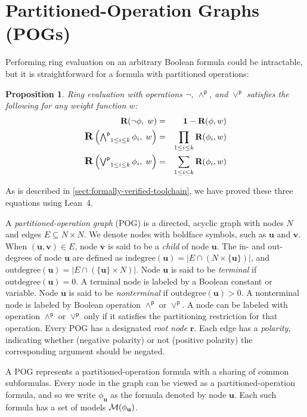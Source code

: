 \documentclass[twoside,11pt]{article}
\newcommand{\pand}{\mathbin{\land^\textsf{p}}}
\newcommand{\por}{\mathbin{\lor^\textsf{p}}}
\DeclareMathOperator*{\Pand}{\bigwedge^\textsf{p}}
\DeclareMathOperator*{\Por}{\bigvee^\textsf{p}}
\newcommand{\boolnot}{\neg}
\newcommand{\rep}{\textbf{R}}
\newcommand{\mulident}{\textbf{1}}
\newcommand{\modelset}{{\cal M}}
\newcommand{\indegree}{\textrm{indegree}}
\newcommand{\outdegree}{\textrm{outdegree}}
\newcommand{\makenode}[1]{\mathbf{#1}}
\newcommand{\nodeu}{\makenode{u}}
\newcommand{\nodev}{\makenode{v}}
\newcommand{\noder}{\makenode{r}}
\newtheorem{prop}{Proposition}
\newcommand{\lean}{Lean~4}
\begin{document}
\section{Partitioned-Operation Graphs (POGs)}
\label{sect:pog}

Performing ring evaluation on an arbitrary Boolean formula could be intractable, but it is straightforward for a formula with partitioned operations:
\begin{prop}
\label{prop:ring:eval}
Ring evaluation with operations $\boolnot$, $\pand$, and $\por$ satisfies the following for any weight function $w$:
\begin{eqnarray}
\rep(\boolnot \phi,\; w) &=& \mulident - \rep(\phi, w) \label{eqn:ring:negation}\\
\textstyle
\scalebox{1.2}{\rep}\left(\Pand_{1 \leq i \leq k} \phi_i,\; w \right) &=& \prod_{1 \leq i \leq k} \rep(\phi_i, w) \label{eqn:ring:product}\\
\textstyle
\scalebox{1.2}{\rep}\left(\Por_{1 \leq i \leq k} \phi_i,\; w\right) &=& \sum_{1 \leq i \leq k} \rep(\phi_i, w) \label{eqn:ring:sum} 
\end{eqnarray}
\end{prop}
As is described in \ref{sect:formally-verified-toolchain}, we have proved these three equations using \lean{}.

A \emph{partitioned-operation graph} (POG) is a directed, acyclic
graph with nodes $N$ and edges $E \subseteq N \times N$.  We denote
nodes with boldface symbols, such as $\nodeu$ and $\nodev$.  When
$(\nodeu,\nodev) \in E$, node $\nodev$ is said to be a \emph{child} of
node $\nodeu$.  The in- and out-degrees of node $\nodeu$ are defined
as $\indegree(\nodeu) = | E \cap (N \times \{\nodeu\}) |$, and
$\outdegree(\nodeu) = | E \cap (\{\nodeu\} \times N) |$.  Node
$\nodeu$ is said to be \emph{terminal} if $\outdegree(\nodeu) = 0$.  A
terminal node is labeled by a Boolean constant or variable.  Node
$\nodeu$ is said to be \emph{nonterminal} if $\outdegree(\nodeu) > 0$.
A nonterminal node is labeled by Boolean operation $\pand$ or $\por$.
A node can be labeled with operation $\pand$ or $\por$ only if it
satisfies the partitioning restriction for that operation.  Every POG
has a designated \emph{root node} $\noder$.  Each edge has
a \emph{polarity}, indicating whether (negative polarity) or not
(positive polarity) the corresponding argument should be negated.

A POG represents a partitioned-operation
formula with a sharing of common subformulas.  Every node in the graph can be viewed as a partitioned-operation formula, and so we write
$\phi_{\nodeu}$ as the formula denoted by node $\nodeu$.
Each such formula has a set of models $\modelset(\phi_{\nodeu})$.
\end{document}
